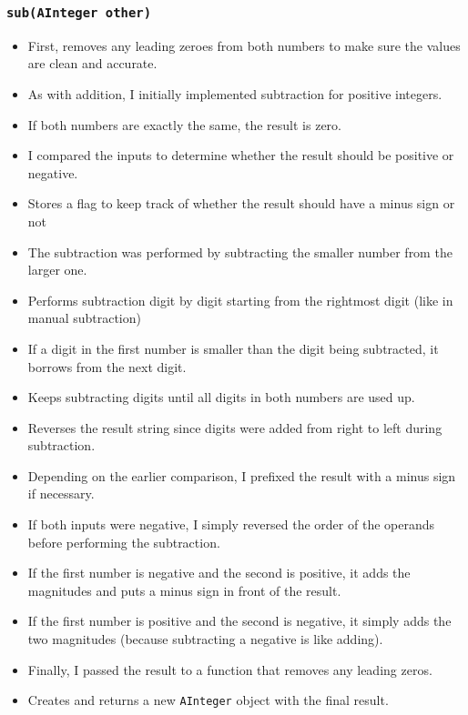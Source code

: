 \documentclass{article}
\begin{document}
\subsubsection*{\texttt{sub(AInteger other)}}
\begin{itemize}
    \item First, removes any leading zeroes from both numbers to make sure the values are clean and accurate.
    \item As with addition, I initially implemented subtraction for positive integers.
    \item If both numbers are exactly the same, the result is zero.
    \item I compared the inputs to determine whether the result should be positive or negative.
    \item Stores a flag to keep track of whether the result should have a minus sign or not
    \item The subtraction was performed by subtracting the smaller number from the larger one.
    \item Performs subtraction digit by digit starting from the rightmost digit (like in manual subtraction)
    \item If a digit in the first number is smaller than the digit being subtracted, it borrows from the next digit.
    \item Keeps subtracting digits until all digits in both numbers are used up.
    \item Reverses the result string since digits were added from right to left during subtraction. 
    \item Depending on the earlier comparison, I prefixed the result with a minus sign if necessary.
    \item If both inputs were negative, I simply reversed the order of the operands before performing the subtraction.
    \item If the first number is negative and the second is positive, it adds the magnitudes and puts a minus sign in front of the result.
    \item If the first number is positive and the second is negative, it simply adds the two magnitudes (because subtracting a negative is like adding).
    \item Finally, I passed the result to a function that removes any leading zeros.
    \item Creates and returns a new \texttt{AInteger} object with the final result.
\end{itemize}
\end{document}
